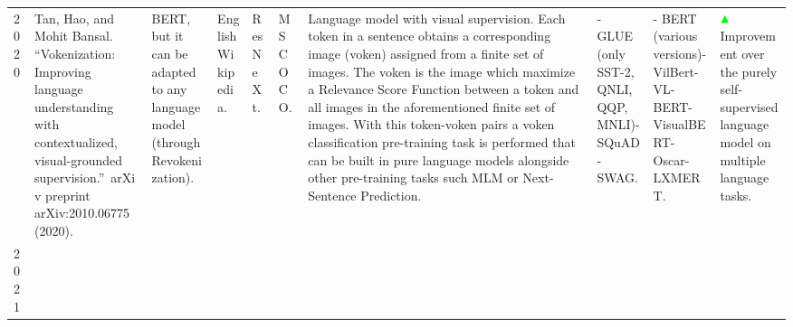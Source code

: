 \documentclass[
]{krantz}
\begin{document}
\begin{longtable}[]{@{}llllllllll@{}}
\begin{minipage}[t]{0.00\columnwidth}
2020\strut
\end{minipage} & \begin{minipage}[t]{0.06\columnwidth}\raggedright
Tan, Hao, and Mohit Bansal. ``Vokenization: Improving language understanding with contextualized, visual-grounded supervision.''~arXiv preprint arXiv:2010.06775~(2020).\strut
\end{minipage} & \begin{minipage}[t]{0.04\columnwidth}\raggedright
BERT, but it can be adapted to any language model (through Revokenization).\strut
\end{minipage} & \begin{minipage}[t]{0.02\columnwidth}\raggedright
English Wikipedia.\strut
\end{minipage} & \begin{minipage}[t]{0.07\columnwidth}\raggedright
ResNeXt.\strut
\end{minipage} & \begin{minipage}[t]{0.05\columnwidth}\raggedright
MS COCO.\strut
\end{minipage} & \begin{minipage}[t]{0.25\columnwidth}\raggedright
Language model with visual supervision. Each token in a sentence obtains a corresponding image (voken) assigned from a finite set of images. The voken is the image which maximize a Relevance Score Function between a token and all images in the aforementioned finite set of images. With this token-voken pairs a voken classification pre-training task is performed that can be built in pure language models alongside other pre-training tasks such MLM or Next-Sentence Prediction.\strut
\end{minipage} & \begin{minipage}[t]{0.08\columnwidth}\raggedright
- GLUE (only SST-2, QNLI, QQP, MNLI)- SQuAD- SWAG.\strut
\end{minipage} & \begin{minipage}[t]{0.05\columnwidth}\raggedright
- BERT (various versions)- VilBert- VL-BERT- VisualBERT- Oscar- LXMERT.\strut
\end{minipage} & \begin{minipage}[t]{0.13\columnwidth}\raggedright
\(\color{green}\blacktriangle\) Improvement over the purely self-supervised language model on multiple language tasks.\strut
\end{minipage}\tabularnewline
\begin{minipage}[t]{0.00\columnwidth}\raggedright
2021\strut
\end{minipage} & \begin{minipage}[t]{0.06\columnwidth}\raggedright

\end{minipage}
\end{longtable}
\end{document}
